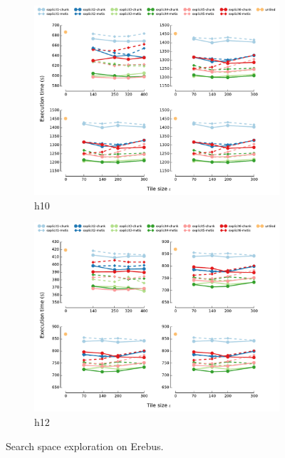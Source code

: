 \begin{figure}[htpb]
\begin{subfigure}[]{1\textwidth}
\includegraphics[scale=0.55]{sparsetiling/perf-eval/grid_erebus_plexmesh_h10_mpi.pdf}
\caption{h10}
\label{fig:st-erebus-expl-h10}
\end{subfigure}%
\par\bigskip
\par\medskip
\begin{subfigure}[]{1\textwidth}
\includegraphics[scale=0.55]{sparsetiling/perf-eval/grid_erebus_plexmesh_h12_mpi.pdf}
\caption{h12}
\label{fig:st-erebus-expl-h12}
\end{subfigure}%

\caption{Search space exploration on Erebus.}
\label{fig:st-erebus-expl}
\end{figure}




